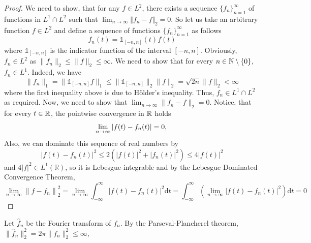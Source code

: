 \begin{proof}
    We need to show, that for any \(f \in L^2\), there exists a sequence \(\{f_n\}_{n=1}^{\infty}\) of functions
    in \(L^1 \cap L^2\) such that \(\lim_{n \to \infty} \Vert f_n - f \Vert_2 = 0\). So let us take an arbitrary
    function \(f \in L^2\) and define a sequence of functions \(\{f_n\}_{n=1}^{\infty}\) as follows
    \begin{equation*}
        f_n(t) = \mathbb{1}_{[-n,n]}(t)f(t)
    \end{equation*}
    where \(\mathbb{1}_{[-n,n]}\) is the indicator function of the interval \([-n,n]\). Obviously, \(f_n \in L^2\)
    as \(\lVert f_n \rVert_2 \leq \lVert f \rVert_2 \leq \infty \).  We need to show that for every
    \(n \in \mathbb{N}\setminus \left\{ 0 \right\}  \), \(f_n \in L^1\). Indeed, we have
    \begin{equation*}
        \lVert f_n \rVert_1 = \lVert \mathbb{1}_{[-n,n]}f \rVert_1 \leq \lVert \mathbb{1}_{[-n,n]} \rVert_2 \lVert f \rVert_2
        = \sqrt{2n} \lVert f \rVert_2 < \infty
    \end{equation*}
    where the first inequality above is due to Hölder's inequality.
    Thus, \(f_n \in L^1 \cap L^2\) as required. Now, we need to show that \(\lim_{n \to \infty} \lVert f_n - f \rVert_2 = 0\).
    Notice, that for every \(t\in\mathbb{R}\), the pointwise convergence in \(\mathbb{R}\)  holds
    \begin{equation*}
        \lim_{n \to  \infty} \vert  f(t)-f_n(t) \vert=0,                                           \\
    \end{equation*}
    Also, we can dominate this sequence of real numbers by
    \begin{equation*}
        \left|f(t)-f_n(t)\right|^2 \leq 2\left(|f(t)|^2+\left|f_n(t)\right|^2\right) \leq 4|f(t)|^2
    \end{equation*}
    and \(4|f|^2 \in L^1(\mathbb{R})\), so it is Lebesgue-integrable and by the Lebesgue Dominated Convergence Theorem,
    \begin{equation*}
        \lim_{n \to \infty}\left\|f-f_n\right\|_2^2=\lim_{n \to  \infty} \int_{-\infty}^{\infty}\left|f(t)-f_n(t)\right|^2 \mathrm{d}t =\int_{-\infty}^{\infty}\left(\lim_{n \to  \infty}\left|f(t)-f_n(t)\right|^2\right) \mathrm{d}t =0
    \end{equation*}
\end{proof}
Let \(\hat{f}_n\) be the Fourier transform of \(f_n\). By the Parseval-Plancherel theorem, \(\lVert \hat{f}_n \rVert_2^2 = 2\pi \lVert f_n \rVert_2^2 \leq \infty  \),
